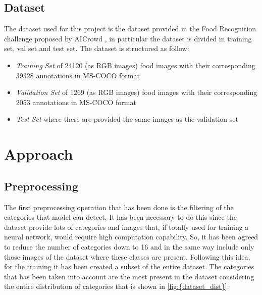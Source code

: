 \documentclass[a4paper,10pt]{report}
\begin{document}
{\section{Dataset}\label{sec:section-22}
The dataset used for this project is the dataset provided in the Food Recognition challenge proposed by AICrowd \cite{aicrowd}, in particular the dataset is divided in  training set, val set and test set. The dataset is structured as follow:
\begin{itemize}
    \item \emph{Training Set} of 24120 (as RGB images) food images with their corresponding 39328 annotations in MS-COCO format
    \item \emph{Validation Set} of 1269 (as RGB images) food images with their corresponding 2053 annotations in MS-COCO format
    \item \emph{Test Set} where there are provided the same images as the validation set
\end{itemize}
}




\chapter{Approach}\label{chap:chapter-3}

\section{Preprocessing}\label{sec:section-31}
The first preprocessing operation that has been done is the filtering of the categories that model can detect. It has been necessary to do this since the dataset provide lots of categories and images that, if totally used for training a neural network, would require high computation capability. So, it has been agreed to reduce the number of categories down to 16 and in the same way include only those images of the dataset where these classes are present. Following this idea, for the training it has been created a subset of the entire dataset. The categories that has been taken into account are the most present in the dataset considering the entire distribution of categories that is shown in \ref{fig:{dataset_dist}}:
\end{document}
